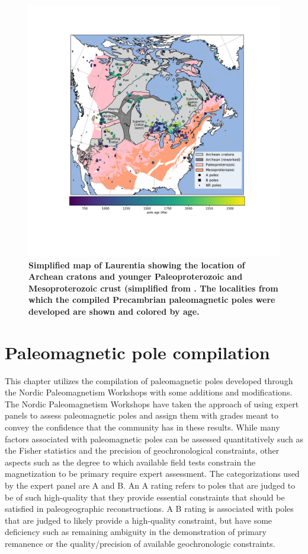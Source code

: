 \documentclass[11pt,letterpaper]{article}
\begin{document}
\begin{figure}
\centering
\includegraphics[width=6.5 in]{Figures/Fig1_map.pdf}
\caption{\small{\textbf{Simplified map of Laurentia showing the location of Archean cratons and younger Paleoproterozoic and Mesoproterozoic crust (simplified from \cite{Whitmeyer2007a}. The localities from which the compiled Precambrian paleomagnetic poles were developed are shown and colored by age.}}}
\label{fig:Laurentia_map}
\end{figure}

\section{Paleomagnetic pole compilation}

This chapter utilizes the compilation of paleomagnetic poles developed through the Nordic Paleomagnetism Workshops with some additions and modifications. The Nordic Paleomagnetism Workshops have taken the approach of using expert panels to assess paleomagnetic poles and assign them with grades meant to convey the confidence that the community has in these results. While many factors associated with paleomagnetic poles can be assessed quantitatively such as the Fisher statistics and the precision of geochronological constraints, other aspects such as the degree to which available field tests constrain the magnetization to be primary require expert assessment. The categorizations used by the expert panel are A and B. An A rating refers to poles that are judged to be of such high-quality that they provide essential constraints that should be satisfied in paleogeographic reconstructions. A B rating is associated with poles that are judged to likely provide a high-quality constraint, but have some deficiency such as remaining ambiguity in the demonstration of primary remanence or the quality/precision of available geochronologic constraints.
\end{document}
